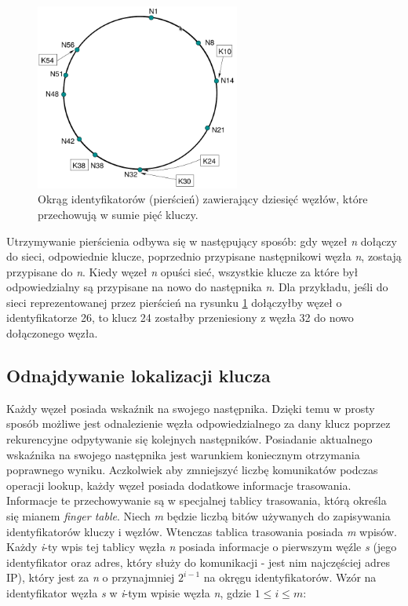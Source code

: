 \documentclass[12pt, twoside, openany]{report}
\begin{document}
\begin{figure}[H]
\centering
\includegraphics[width=0.6\textwidth,height=\textheight,keepaspectratio]{ring.png}
\caption{Okrąg identyfikatorów (pierścień) zawierający dziesięć węzłów, które przechowują w sumie pięć kluczy.}
\label{fig:pierscien}
\end{figure}

Utrzymywanie pierścienia odbywa się w następujący sposób: gdy węzeł \textit{n} dołączy do sieci, odpowiednie klucze, poprzednio przypisane następnikowi węzła \textit{n}, zostają przypisane do \textit{n}. Kiedy węzeł \textit{n} opuści sieć, wszystkie klucze za które był odpowiedzialny są przypisane na nowo do następnika \textit{n}. Dla przykładu, jeśli do sieci reprezentowanej przez pierścień na rysunku \ref{fig:pierscien} dołączyłby węzeł o identyfikatorze 26, to klucz 24 zostałby przeniesiony z węzła 32 do nowo dołączonego węzła.

\subsection{Odnajdywanie lokalizacji klucza}

Każdy węzeł posiada wskaźnik na swojego następnika. Dzięki temu w prosty sposób możliwe jest odnalezienie węzła odpowiedzialnego za dany klucz poprzez rekurencyjne odpytywanie się kolejnych następników. Posiadanie aktualnego wskaźnika na swojego następnika jest warunkiem koniecznym otrzymania poprawnego wyniku. Aczkolwiek aby zmniejszyć liczbę komunikatów podczas operacji lookup, każdy węzeł posiada dodatkowe informacje trasowania. Informacje te przechowywanie są w specjalnej tablicy trasowania, którą określa się mianem \textit{finger table}. Niech \textit{m} będzie liczbą bitów używanych do zapisywania identyfikatorów kluczy i węzłów. Wtenczas tablica trasowania posiada \textit{m} wpisów. Każdy \textit{i}-ty wpis tej tablicy węzła \textit{n} posiada informacje o pierwszym węźle \textit{s} (jego identyfikator oraz adres, który służy do komunikacji - jest nim najczęściej adres IP), który jest za \textit{n} o przynajmniej $2^{i-1}$ na okręgu identyfikatorów. Wzór na identyfikator węzła \textit{s} w \textit{i}-tym wpisie węzła \textit{n}, gdzie $1\leq i \leq m$:
\end{document}
